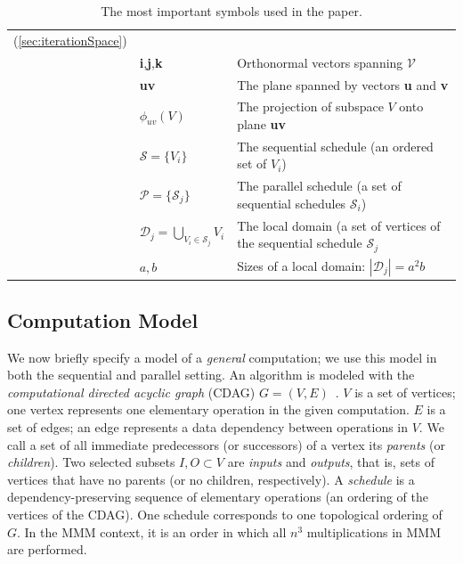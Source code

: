 \documentclass[sigplan,review,anonymous,10pt]{acmart}\settopmatter{printfolios=true,printccs=false,printacmref=false}
\begin{document}
\begin{table}[h]
\begin{tabular}{@{}l|ll@{}}
		(\cref{sec:iterationSpace})\\         
		& \textbf{i},\textbf{j},\textbf{k} & Orthonormal vectors spanning 
		$\mathcal{V}$\\
		& \textbf{uv} & The plane spanned by vectors \textbf{u} and \textbf{v}\\
		& $\phi_{uv}(V)$ & The projection of subspace $V$ onto plane 
		\textbf{uv}\\
		& $\mathcal{S} = \{V_i\}$ & The sequential schedule (an ordered set of 
		 $V_i$) \\ 
		& $\mathcal{P} = \{\mathcal{S}_j\}$ & The parallel schedule (a set of 
		sequential schedules $\mathcal{S}_i$) \\
		& $\mathcal{D}_j = \bigcup_{V_i \in \mathcal{S}_j}V_i $ & The local 
		domain 
		(a set of vertices 
		of the sequential schedule $\mathcal{S}_j$ \\
		& $a,b$ &  Sizes of a local domain: $|\mathcal{D}_j| = a^2b$\\
		
		\bottomrule
	\end{tabular}
	\caption{The most important symbols used in the paper.}
\vspace{-1em}
%
	\label{tab:symbols}
\end{table}


\subsection{Computation Model}

We now briefly specify a model of a \emph{general} computation; we use this
model in both the sequential and parallel setting.
An algorithm is modeled with the \emph{computational directed acyclic graph} 
(CDAG)
$G=(V,E)$~\cite{completeRegisterProblems,pebblegameregister,
registerpebblecolor}.  $V$ is a set of vertices; one vertex represents one
elementary operation in the given computation. $E$ is a set of edges; an edge
represents a data dependency between operations in $V$. We call a set of all
immediate predecessors (or successors) of a vertex its \emph{parents} (or
\emph{children}).  Two selected subsets $I, O \subset V$ are \emph{inputs} and
\emph{outputs}, that is, sets of vertices that have no parents (or no children,
respectively).
%
A \emph{schedule} is a dependency-preserving sequence of elementary operations
(an ordering of the vertices of the CDAG). One schedule corresponds to one 
topological
ordering of $G$. In the MMM context, it is an order in which all $n^3$
multiplications in MMM are performed.
\end{document}
